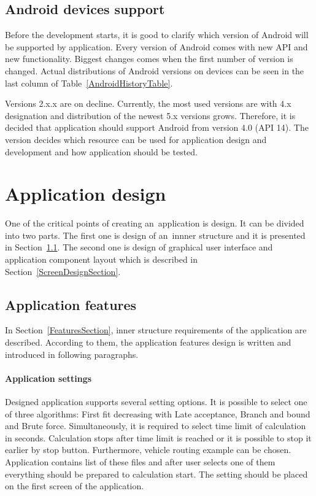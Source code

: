 \subsection{Android devices support}
Before the development starts, it is good to clarify which version of Android will be supported by application. Every
version of Android comes with new API and new functionality. Biggest changes comes when the first number of version is
changed. Actual distributions of Android versions on devices can be seen in the last column of
Table~\ref{AndroidHistoryTable}.

Versions 2.x.x are on decline. Currently, the most used versions are with 4.x designation and distribution of the newest
5.x versions grows. Therefore, it is decided that application should support Android from version 4.0 (API 14). The
version decides which resource can be used for application design and development and how application should be tested.

\section{Application design}\label{ApplicationDesignSection}
One of the critical points of creating an~application is design. It can be divided into two parts. The first one is
design of an~innner structure and it is presented in Section~\ref{ApplicationFeatureSection}. The second one is design
of graphical user interface and application component layout which is described in Section~\ref{ScreenDesignSection}.

\subsection{Application features}\label{ApplicationFeatureSection}
In Section~\ref{FeaturesSection}, inner structure requirements of the application are described. According to them, the
application features design is written and introduced in following paragraphs.

\paragraph{Application settings}
Designed application supports several setting options. It is possible to select one of three algorithms: First fit
decreasing with Late acceptance, Branch and bound and Brute force. Simultaneously, it is required to select time limit
of calculation in seconds. Calculation stops after time limit is reached or it is possible to stop it earlier by stop
button. Furthermore, vehicle routing example can be chosen. Application contains list of these files and after user
selects one of them everything should be prepared to calculation start. The setting should be placed on the first screen
of the application.

